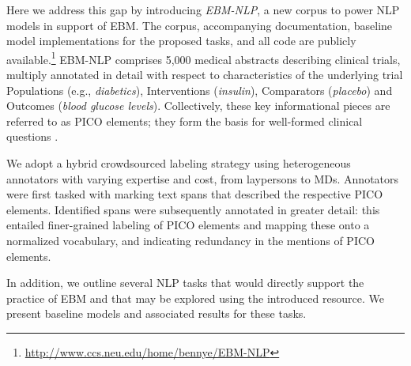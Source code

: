 \documentclass[11pt,a4paper]{article}
\begin{document}
Here we address this gap by introducing \emph{EBM-NLP}, a new corpus to power NLP models in support of EBM. The corpus, accompanying documentation, baseline model implementations for the proposed tasks, and all code are publicly available.\footnote{\url{http://www.ccs.neu.edu/home/bennye/EBM-NLP}} EBM-NLP comprises 5,000 medical abstracts describing clinical trials, multiply annotated in detail with respect to characteristics of the underlying trial Populations (e.g., \emph{diabetics}), Interventions (\emph{insulin}), Comparators (\emph{placebo}) and Outcomes (\emph{blood glucose levels}). Collectively, these key informational pieces are referred to as PICO elements; they form the basis for well-formed clinical questions \cite{huang2006evaluation}. 

We adopt a hybrid crowdsourced labeling strategy using heterogeneous annotators with varying expertise and cost, from laypersons to MDs. Annotators were first tasked with marking text spans that described the respective PICO elements. Identified spans were subsequently annotated in greater detail: this entailed finer-grained labeling of PICO elements and mapping these onto a normalized vocabulary, and indicating redundancy in the mentions of PICO elements. 

In addition, we outline several NLP tasks that would directly support the practice of EBM and that may be explored using the introduced resource. We present baseline models and associated results for these tasks. 





\begin{comment}
\begin{itemize}
\item We present a new, high-quality, publicly available corpus of richly annotated biomedical abstracts. This addresses a major hindrance of NLP researchers hoping to work on important medical tasks: a dearth of readily available corpora. Our hope is that this dataset is used to build novel models that aid specialists attempting to make sense of the biomedical evidence base.

\item Annotating biomedical abstracts constitutes a difficult task, but relying exclusively on MDs would be prohibitively expensive. The approach we outline in this work provides evidence that hybrid crowdsourced strategies can be used to build relatively high-quality corpora, even in specialized domains.
\end{itemize}
\end{comment}
\end{document}
